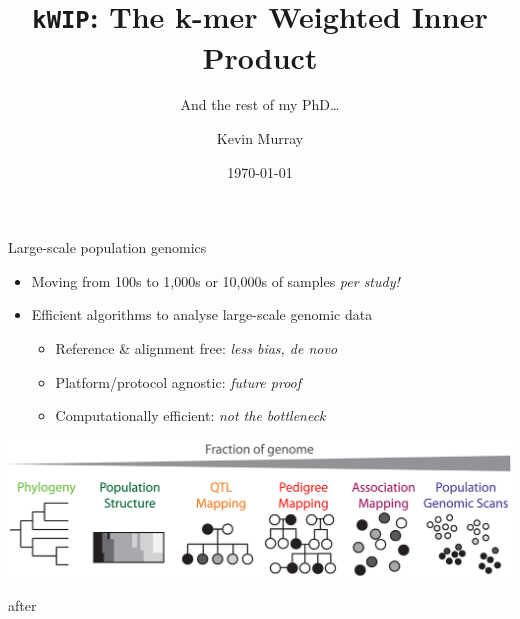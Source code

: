 \documentclass[t]{beamer}
\title{\texttt{kWIP}: The k-mer Weighted Inner Product}
\subtitle{And the rest of my PhD\ldots}
\author{Kevin Murray}
\institute{Borevitz Lab, CPEB, ANU}
\date{\today}
\begin{document}
{
\begin{frame}
  \titlepage
  \vfill
\end{frame}
}

\begin{frame}{Large-scale population genomics}
  \begin{itemize}
    \item Moving from 100s to 1,000s or 10,000s of samples \emph{per study!}
    \item Efficient algorithms to analyse large-scale genomic data
    \begin{itemize}
      \item Reference \& alignment free: \textit{less bias, de novo}
      \item Platform/protocol agnostic: \textit{future proof}
      \item Computationally efficient: \textit{not the bottleneck}
    \end{itemize}
  \end{itemize}
  \begin{center}
    \includegraphics[width=\textwidth]{img/cross-scale.png}
  \end{center}
  \tiny{after \textcite{peterson_double_2012}}
\end{frame}
\end{document}
